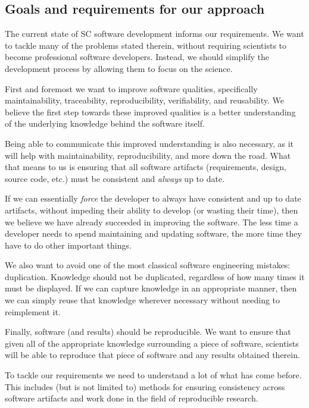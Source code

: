 \documentclass[preprint, 10pt]{sigplanconf}
\begin{document}
\subsection{Goals and requirements for our approach}

The current state of SC software development informs our requirements. We want
to tackle many of the problems stated therein, without requiring scientists to
become professional software developers. Instead, we should simplify the
development process by allowing them to focus on the science.

First and foremost we want to improve software qualities, specifically
maintainability, traceability, reproducibility, verifiability, and reusability.
We believe the first step towards these improved qualities is a better
understanding of the underlying knowledge behind the software itself.

Being able to communicate this improved understanding is also necessary, as it
will help with maintainability, reproducibility, and more down the road. What
that means to us is ensuring that all software artifacts (requirements, design,
source code, etc.) must be consistent and \emph{always} up to date.

If we can essentially \emph{force} the developer to always have consistent and up
to date artifacts, without impeding their ability to develop (or wasting their
time), then we believe we have already succeeded in improving the software. The
less time a developer needs to spend maintaining and updating software, the
more time they have to do other important things. 

We also want to avoid one of the most classical software engineering mistakes:
duplication. Knowledge should not be duplicated, regardless of how many times it
must be displayed. If we can capture knowledge in an appropriate manner, then we
can simply reuse that knowledge wherever necessary without needing to
reimplement it.

Finally, software (and results) should be reproducible. We want to ensure that
given all of the appropriate knowledge surrounding a piece of software,
scientists will be able to reproduce that piece of software and any results
obtained therein.

To tackle our requirements we need to understand a lot of what has come before.
This includes (but is not limited to) methods for ensuring consistency across
software artifacts and work done in the field of reproducible research.
\end{document}
